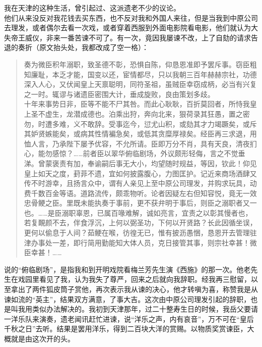我在天津的这种生活，曾引起过、这派遗老不少的议论。\\

他们从来没反对我花钱去买东西，也不反对我和外国人来往，但是当我到中原公司去理发，或者偶尔去看一次戏，或者穿着西服到外面电影院看电影，他们就认为大失帝王威仪，非来一番苦谏不可了。有一次，竟因我屡谏不改，上了自劾的请求告退的奏折（原文抬头处，我都改成了空一格）：\\

\begin{quote}
	奏为微臣积年溺职，致圣德不彰，恐惧自陈，仰恳恩准即予罢斥事。窃臣粗知廉耻，本乏才能，国变以还，宦情都尽，只以我朝三百年赫赫宗社，功德深入人心，又伏闻皇上天禀聪明，同符圣祖，虽贼臣幸窃成柄，必当有兴复之一时。辄谬与诸遗臣密围大计，垂成旋败，良由策划多歧。\\

十年来事势日非，臣等不能不尸其咎。而此心耿耿，百折莫回者，所恃我皇上圣不虚生，龙潜成德也。泊乘出狩，奔向北来，狠荷录其狂愚，置之密勿，时遭多难，义不敢辞。受事迄今，愆尤山积，或劾其才力竭蹶矣，或斥其妒贤嫉能矣，或病其性情褊急矣，或低其贪糜厚禄矣。经臣再三求退，用恤人言，乃承陛下屡予优容，不允所请。臣即万分不肖，具有天良，清夜扪心，能勿感惊？……前者臣以翠华俯临剧场，外议颇形轻侮，言之不觉垂涕。曾蒙褒责有加，奉谕嗣后事无大小，均望随时规益，等因，钦此！仰见皇上如天之度，葑菲不遗，宜如何披露腹心，力图匡护。记近来商场酒肆又传不时游幸，且扬言众中，谓有人亲见上至中原公司理发，并购求玩具，动费千数百金等语。道路流传，颇乖物听。论者因疑左右但知容悦，竟无一效忠骨鲠之臣。里既未能执奏于事前，更不获弁明于事后，则臣之溺职者又一也。……是臣溺职辜恩，已属百喙难解，诚如亮言，宜责之以彰其慢者也，若复靦颜不去，伴食浮沉，上何以弼圣功，下何以开贤路？长此因循坐误，更何以偷息于人间？茹鲠在喉，彷徨无已，惟有披沥愚悃，恳恩开去管理驻津办事处一差，即行简用勤能知大体人员，克日接管其事，则宗社幸甚！微臣幸甚！……\\
\end{quote}

说的“俯临剧场”，是指我和到开明戏院看梅兰芳先生演《西施》的那一次。他老先生在戏园里看见了我，认为我失了尊严，回来之后就向我辞职。经我再三慰留，以至拿出了两件狐皮筒子赏他，再次表示我从谏的决心，他才转嗔为喜，称赞我是从谏如流的“英主”，结果双方满意，了事大吉。这次由中原公司理发引起的辞职，也是叫我用类似办法解决的。我初到天津那年，过二十整寿生日的时候，我岳父要请一洋乐队来演奏，遗老闻讯赶忙进谏，说“洋乐之声，内有哀音”，万不可在“皇后千秋之日”去听。结果是罢用洋乐，得到二百块大洋的赏赐。以物质奖赏谏臣，大概就是由这次开的头。\\

